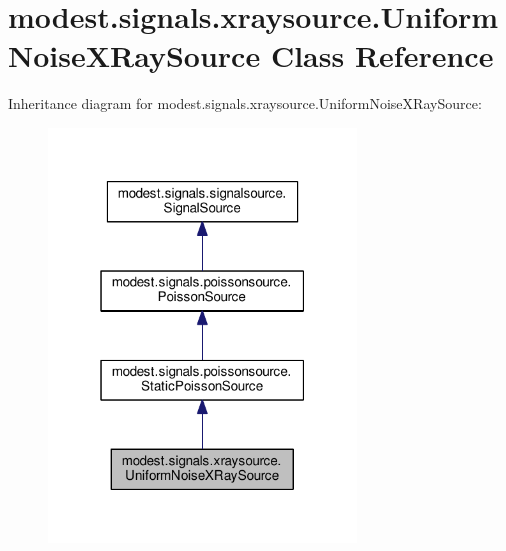 \hypertarget{classmodest_1_1signals_1_1xraysource_1_1UniformNoiseXRaySource}{}\section{modest.\+signals.\+xraysource.\+Uniform\+Noise\+X\+Ray\+Source Class Reference}
\label{classmodest_1_1signals_1_1xraysource_1_1UniformNoiseXRaySource}


Inheritance diagram for modest.\+signals.\+xraysource.\+Uniform\+Noise\+X\+Ray\+Source\+:\nopagebreak
\begin{figure}[H]
\begin{center}
\leavevmode
\includegraphics[width=232pt]{classmodest_1_1signals_1_1xraysource_1_1UniformNoiseXRaySource__inherit__graph}
\end{center}
\end{figure}


